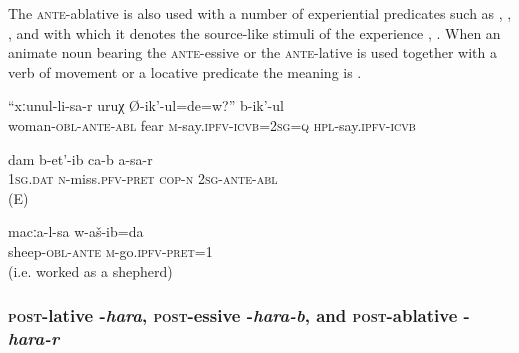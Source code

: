 The \textsc{ante}-ablative is also used with a number of experiential predicates such as , , , and  with which it denotes the source-like stimuli of the experience , . When an animate noun bearing the \textsc{ante}-essive or the \textsc{ante}-lative is used together with a verb of movement or a locative predicate the meaning is  .
%
\begin{exe}
	\ex	\label{They say, are you afraid of your wife}
	\gll	``xːunul-li-sa-r	uruχ	Ø-ik'-ul=de=w?''	b-ik'-ul \\
		woman-\textsc{obl}-\textsc{ante}-\textsc{abl} fear \textsc{m}-say.\textsc{ipfv}-\textsc{icvb}=2\textsc{sg}=\textsc{q} \textsc{hpl}-say.\textsc{ipfv}-\textsc{icvb}\\
	\glt	{}

	\ex	\label{ex:I miss you}
	\gll	dam b-et'-ib ca-b a-sa-r \\
	\textsc{1sg.dat} \textsc{n}-miss.\textsc{pfv-pret} \textsc{cop-n} \textsc{2sg-ante-abl}	\\
	\glt	{} (E)
	
	\ex	\label{I went after the sheep}
	\gll	macːa-l-sa	w-aš-ib=da\\
		sheep-\textsc{obl}-\textsc{ante}	\textsc{m}-go.\textsc{ipfv}-\textsc{pret}=1\\
	\glt‎‎	 (i.e. worked as a shepherd)
\end{exe}



\subsubsection{\textsc{post}-lative -\textit{hara}, \textsc{post}-essive -\textit{hara-b}, and \textsc{post}-ablative -\textit{hara-r}}
\label{sssec:post-lative -hara, postessive -hara-b, and post-ablative -hara-r}

